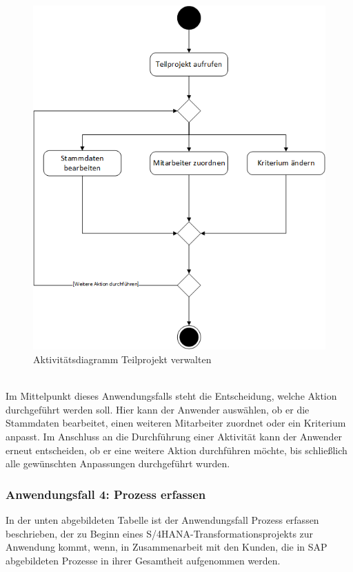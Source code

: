\begin{figure}[h!]
    \centering
    \includegraphics[scale=0.67]{./Bilder/AD3_TeilprojektVerwalten.png}
    \caption[Aktivitätsdiagramm Anwendungsfall 3]{Aktivitätsdiagramm Teilprojekt verwalten}
    \label{fig:AD3}
\end{figure}
\\Im Mittelpunkt dieses Anwendungsfalls steht die Entscheidung, welche Aktion durchgeführt werden soll. Hier kann der Anwender auswählen, ob er die Stammdaten bearbeitet, einen weiteren Mitarbeiter zuordnet oder ein Kriterium anpasst. Im Anschluss an die Durchführung einer Aktivität kann der Anwender erneut entscheiden, ob er eine weitere Aktion durchführen möchte, bis schließlich alle gewünschten Anpassungen durchgeführt wurden.

\newpage
\subsubsection{Anwendungsfall 4: Prozess erfassen}
In der unten abgebildeten Tabelle ist der Anwendungsfall \glqq{}Prozess erfassen\grqq{} beschrieben, der zu Beginn eines S/4HANA-Transformationsprojekts zur Anwendung kommt, wenn, in Zusammenarbeit mit den Kunden, die in SAP abgebildeten Prozesse in ihrer Gesamtheit aufgenommen werden.\\

